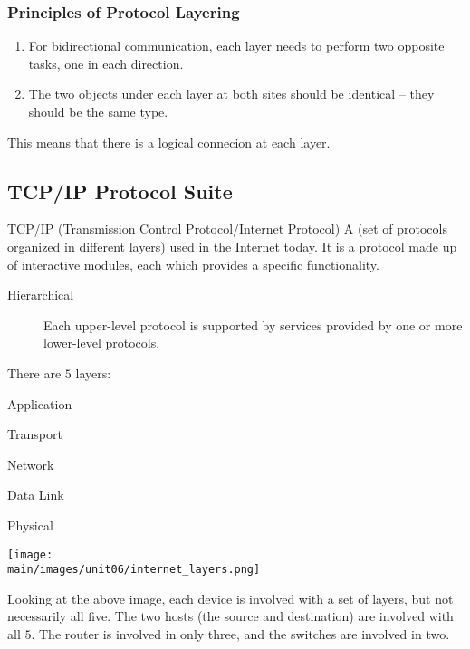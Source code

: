 \documentclass[\main/notes.tex]{subfiles}
\begin{document}
				\subsubsection{Principles of Protocol Layering}
					\begin{enumerate}
						\item For bidirectional communication, each layer needs to perform two opposite tasks, one in each direction.
						\item The two objects under each layer at both sites should be identical -- they should be the same type.
					\end{enumerate}
				This means that there is a logical connecion at each layer.

			\subsection{TCP/IP Protocol Suite}
					\begin{definition}{TCP/IP (Transmission Control Protocol/Internet Protocol)}
						A  (set of protocols organized in different layers) used in the Internet today. It is a  protocol made up of interactive modules, each which provides a specific functionality.

						\begin{description}
							\item[Hierarchical] Each upper-level protocol is supported by services provided by one or more lower-level protocols.
						\end{description}
					\end{definition}

					There are $5$ layers:
					\begin{indentparagraph}
						\begin{LayerList}[start=5]
							\item Application
							\item Transport
							\item Network
							\item Data Link
							\item Physical
						\end{LayerList}
					\end{indentparagraph}

					\begin{center}
						\texttt{[image: \\main/images/unit06/internet\_layers.png]}
					\end{center}
					Looking at the above image, each device is involved with a set of layers, but not necessarily all five. The two hosts (the source and destination) are involved with all $5$. The router is involved in only three, and the switches are involved in two.
\end{document}
